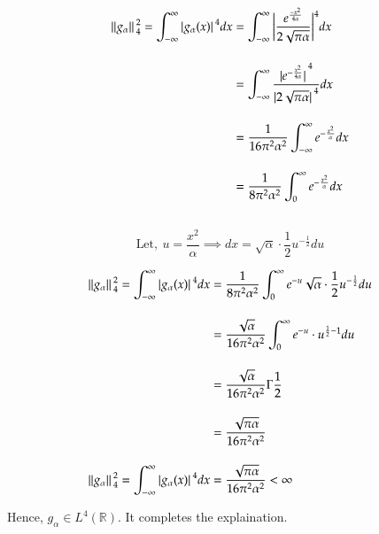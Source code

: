 \documentclass[12pt, a4paper]{article} %
\begin{document}
\begin{equation*}
    \begin{split}
        \norm*{g_{\alpha}}_4^2 = \int_{-\infty}^{\infty}\abs*{g_{\alpha} (x)}^4 dx & = \int_{-\infty}^{\infty}\bigg|\frac{e^{\frac{-x^2}{4\alpha}}}{2\sqrt{\pi \alpha}}\bigg|^4 dx\\[4mm]
        & = \int_{-\infty}^{\infty}\frac{\abs*{e^{-\frac{x^2}{4\alpha}}}^4}{\abs*{2\sqrt{\pi \alpha}}^4}dx\\[4mm]
        & = \frac{1}{16\pi^2 \alpha^2}\int_{-\infty}^{\infty}e^{-\frac{x^2}{\alpha}}dx\\[4mm]
        & = \frac{1}{8\pi^2 \alpha^2}\int_{0}^{\infty}e^{-\frac{x^2}{\alpha}}dx\\[4mm]
    \end{split}
\end{equation*}

\[\boxed{\mbox{Let},\ u = \frac{x^2}{\alpha} \implies dx = \sqrt{\alpha}\cdot \frac{1}{2}u^{-\frac{1}{2}}du}\]

\begin{equation*}
    \begin{split}
        \norm*{g_{\alpha}}_4^2 = \int_{-\infty}^{\infty}\abs*{g_{\alpha} (x)}^4 dx & = \frac{1}{8\pi^2 \alpha^2}\int_{0}^{\infty}e^{-u}\sqrt{\alpha}\cdot \frac{1}{2}u^{-\frac{1}{2}}du\\[4mm]
        & = \frac{\sqrt{\alpha}}{16\pi^2 \alpha^2}\int_{0}^{\infty}e^{-u}\cdot u^{\frac{1}{2}-1}du\\[4mm]
        & = \frac{\sqrt{\alpha}}{16\pi^2 \alpha^2}\Gamma\frac{1}{2}\\[4mm]
        & = \frac{\sqrt{\pi \alpha}}{16\pi^2 \alpha^2}\\[4mm]
        \norm*{g_{\alpha}}_4^2 = \int_{-\infty}^{\infty}\abs*{g_{\alpha} (x)}^4 dx & = \frac{\sqrt{\pi \alpha}}{16\pi^2 \alpha^2} < \infty
    \end{split}
\end{equation*}

Hence, $g_\alpha \in L^4(\mathbb{R})$. It completes the explaination.
\end{document}
